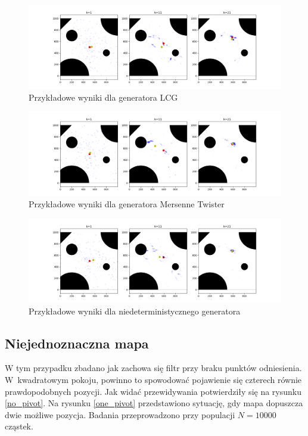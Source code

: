 \begin{figure}[H]
	\begin{center}
		\includegraphics[width=15cm]{./lcg_example.png}
		\caption{Przykładowe wyniki dla generatora LCG}
		\label{lcg_example}
	\end{center}
\end{figure}

\begin{figure}[H]
	\begin{center}
		\includegraphics[width=15cm]{./mersenne_example.png}
		\caption{Przykładowe wyniki dla generatora Mersenne Twister}
		\label{mersenne_example}
	\end{center}
\end{figure}

\begin{figure}[H]
\begin{center}
	\includegraphics[width=15cm]{./device_example.png}
	\caption{Przykładowe wyniki dla niedeterministycznego generatora}
	\label{device_example}
\end{center}
\end{figure}


\subsection{Niejednoznaczna mapa}
W tym przypadku zbadano jak zachowa się filtr przy braku punktów odniesienia. W~kwadratowym pokoju, powinno to spowodować pojawienie się czterech równie prawdopodobnych pozycji. Jak widać przewidywania potwierdziły się na rysunku \ref{no_pivot}. Na rysunku \ref{one_pivot} przedstawiono sytuację, gdy mapa dopuszcza dwie możliwe pozycja. Badania przeprowadzono przy populacji $N=10000$ cząstek.

